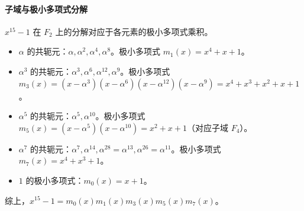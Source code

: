 \documentclass[11pt]{article}
\begin{document}
\paragraph{子域与极小多项式分解}
$x^{15} - 1$ 在 $F_2$ 上的分解对应于各元素的极小多项式乘积。
\begin{itemize}
    \item $\alpha$ 的共轭元：$\alpha, \alpha^2, \alpha^4, \alpha^8$。极小多项式 $m_1(x) = x^4 + x + 1$。
    \item $\alpha^3$ 的共轭元：$\alpha^3, \alpha^6, \alpha^{12}, \alpha^9$。极小多项式 $m_3(x) = (x-\alpha^3)(x-\alpha^6)(x-\alpha^{12})(x-\alpha^9) = x^4 + x^3 + x^2 + x + 1$。
    \item $\alpha^5$ 的共轭元：$\alpha^5, \alpha^{10}$。极小多项式 $m_5(x) = (x-\alpha^5)(x-\alpha^{10}) = x^2 + x + 1$（对应子域 $F_4$）。
    \item $\alpha^7$ 的共轭元：$\alpha^7, \alpha^{14}, \alpha^{28}=\alpha^{13}, \alpha^{26}=\alpha^{11}$。极小多项式 $m_7(x) = x^4 + x^3 + 1$。
    \item $1$ 的极小多项式：$m_0(x) = x + 1$。
\end{itemize}
综上，$x^{15}-1 = m_0(x)m_1(x)m_3(x)m_5(x)m_7(x)$。
\end{document}
